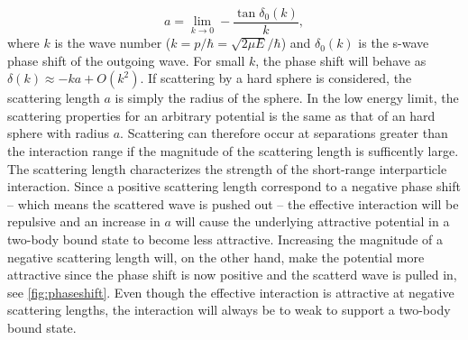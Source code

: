 \documentclass{article}
\numberwithin{equation}{section}
\numberwithin{figure}{section}
\begin{document}
\begin{equation} \label{eq:2}
a = \lim_{k \to 0} -\frac{\tan\delta_0(k)}{k},
\end{equation}
where $k$ is the wave number ($k=p/\hbar = \sqrt{2\mu E}/\hbar$) and $\delta_0(k)$ is the s-wave phase shift of the outgoing wave. For small $k$, the phase shift will behave as $\delta(k)\approx-ka + O(k^2)$. If scattering by a hard sphere is considered, the scattering length $a$ is simply the radius of the sphere. In the low energy limit, the scattering properties for an arbitrary potential is the same as that of an hard sphere with radius $a$. Scattering can therefore occur at separations greater than the interaction range if the magnitude of the scattering length is sufficently large. The scattering length characterizes the strength of the short-range interparticle interaction. Since a positive scattering length correspond to a negative phase shift -- which means the scattered wave is pushed out -- the effective interaction will be repulsive and an increase in $a$ will cause the underlying attractive potential in a two-body bound state to become less attractive. Increasing the magnitude of a negative scattering length will, on the other hand, make the potential more attractive since the phase shift is now positive and the scatterd wave is pulled in, see \cref{fig:phaseshift}. Even though the effective interaction is attractive at negative scattering lengths, the interaction will always be to weak to support a two-body bound state.  
\end{document}
